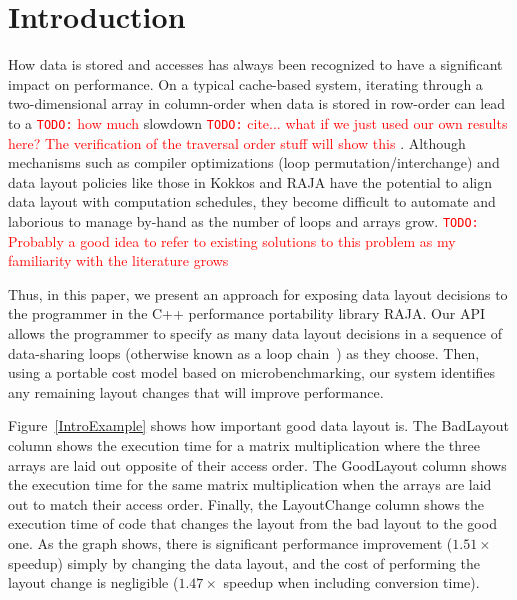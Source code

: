 \documentclass[sigconf, table]{acmart}
\newcommand{\todo}[1]{{\textcolor{red}{{\tt{TODO:}}\,\,#1 }}}
\begin{document}
\maketitle

\section{Introduction}

How data is stored and accesses has always been recognized to have a significant impact on performance. 
On a typical cache-based system, iterating through a two-dimensional array in column-order when data is 
stored in row-order can lead to a \todo{how much} slowdown 
\todo{cite... what if we just used our own results here? The verification of the traversal order stuff will show this}.
Although mechanisms such as compiler optimizations (loop permutation/interchange) 
and data layout policies like those in Kokkos \cite{edwards2014kokkos} and RAJA \cite{hornung2014RAJA} have the potential to align data layout with computation schedules, they become difficult to automate and laborious to manage by-hand as the number of loops and arrays grow.
\todo{Probably a good idea to refer to existing solutions to this problem as my familiarity with the literature grows}

Thus, in this paper, we present an approach for exposing data layout decisions to the programmer in the C++ performance portability library RAJA.
Our API allows the programmer to specify as many data layout decisions in a sequence of data-sharing loops (otherwise known as a loop chain~\cite{krieger2013loop}) as they choose.
Then, using a portable cost model based on microbenchmarking, our system identifies any remaining layout changes that will improve performance.  

Figure~\ref{IntroExample} shows how important good data layout is. 
The BadLayout column shows the execution time for a matrix multiplication where the three arrays are laid out opposite of their access order. 
The GoodLayout column shows the execution time for the same matrix multiplication when the arrays are laid out to match their access order.
Finally, the LayoutChange column shows the execution time of code that changes the layout from the bad layout to the good one.
As the graph shows, there is significant performance improvement ($1.51\times$ speedup) simply by changing the data layout, and the cost of performing the layout change is negligible ($1.47\times$ speedup when including conversion time). 
\end{document}
